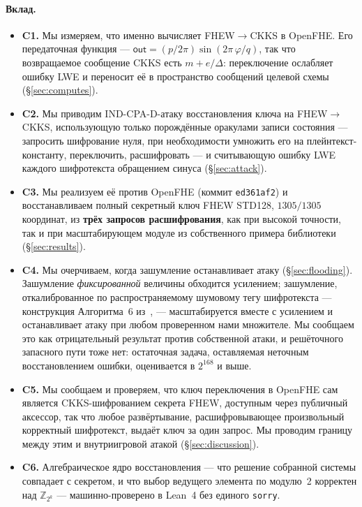 \documentclass[11pt]{article}
\newcommand{\fto}{\texorpdfstring{FHEW$\to$CKKS}{FHEW-to-CKKS}}
\newcommand{\Z}{\mathbb{Z}}
\newcommand{\out}{\mathsf{out}}
\newcommand{\code}[1]{\texttt{#1}}
\begin{document}
\paragraph{Вклад.}
\begin{itemize}
  \item \textbf{C1.} Мы измеряем, что именно вычисляет \fto{} в OpenFHE. Его передаточная функция ---
    $\out = (p/2\pi)\sin(2\pi\,\varphi/q)$, так что возвращаемое сообщение CKKS есть $m + e/\Delta$:
    переключение ослабляет ошибку LWE и переносит её в пространство сообщений целевой схемы
    (\S\ref{sec:computes}).
  \item \textbf{C2.} Мы приводим IND-CPA-D-атаку восстановления ключа на \fto{}, использующую только
    порождённые оракулами записи состояния --- запросить шифрование нуля, при необходимости умножить
    его на плейнтекст-константу, переключить, расшифровать --- и считывающую ошибку LWE каждого
    шифротекста обращением синуса (\S\ref{sec:attack}).
  \item \textbf{C3.} Мы реализуем её против OpenFHE (коммит \code{ed361af2}) и восстанавливаем полный
    секретный ключ FHEW STD128, $1305/1305$ координат, из \textbf{трёх запросов расшифрования}, как
    при высокой точности, так и при масштабирующем модуле из собственного примера библиотеки
    (\S\ref{sec:results}).
  \item \textbf{C4.} Мы очерчиваем, когда зашумление останавливает атаку (\S\ref{sec:flooding}).
    Зашумление \emph{фиксированной} величины обходится усилением; зашумление, откалиброванное по
    распространяемому шумовому тегу шифротекста --- конструкция Алгоритма~6
    из~\cite{santato2026}, --- масштабируется вместе с усилением и останавливает атаку при любом
    проверенном нами множителе. Мы сообщаем это как отрицательный результат против собственной атаки,
    и решёточного запасного пути тоже нет: остаточная задача, оставляемая неточным
    восстановлением ошибки, оценивается в $2^{168}$ и выше.
  \item \textbf{C5.} Мы сообщаем и проверяем, что ключ переключения в OpenFHE сам является
    CKKS-шифрованием секрета FHEW, доступным через публичный аксессор, так что любое развёртывание,
    расшифровывающее произвольный корректный шифротекст, выдаёт ключ за один запрос. Мы проводим
    границу между этим и внутриигровой атакой (\S\ref{sec:discussion}).
  \item \textbf{C6.} Алгебраическое ядро восстановления --- что решение собранной системы совпадает с
    секретом, и что выбор ведущего элемента по модулю~2 корректен над $\Z_{2^k}$ --- машинно-проверено
    в Lean~4 без единого \code{sorry}.
\end{itemize}
\end{document}
